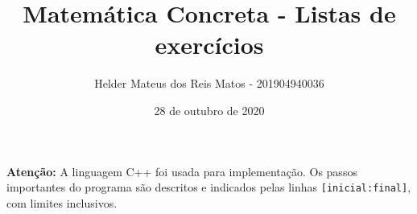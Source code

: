 \documentclass[12pt]{article}
\title{Matemática Concreta - Listas de exercícios}
\author{Helder Mateus dos Reis Matos - 201904940036}
\date{28 de outubro de 2020}
\begin{document}
\maketitle

\textbf{Atenção: } A linguagem C++ foi usada para implementação. Os passos importantes do programa são descritos e indicados pelas linhas \verb|[inicial:final]|, com limites inclusivos.


\pagebreak

\end{document}
